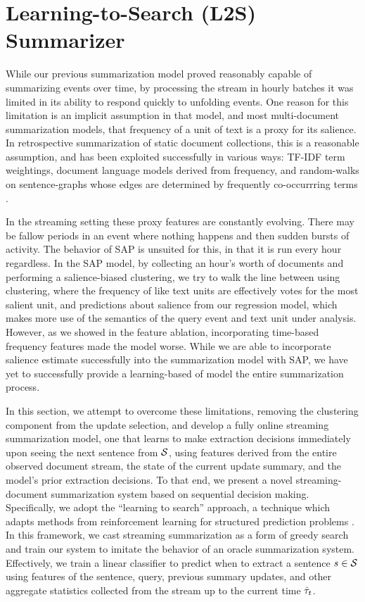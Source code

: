 \section{Learning-to-Search (L2S) Summarizer}

While our previous summarization model proved reasonably capable of summarizing
events over time, by processing the stream in hourly batches it was limited in
its ability to respond quickly to unfolding events. One reason for this
limitation is an implicit assumption in that model, and most multi-document
summarization models, that frequency of a unit of text is a proxy for its
salience. In retrospective summarization of static document collections, this
is a reasonable assumption, and has been exploited successfully in various
ways: TF-IDF term weightings, document language models derived from frequency,
and random-walks on sentence-graphs  whose edges are determined by frequently
co-occurrring terms
\citep{lin2000,radev2000,erkan2004,mihalcea2004,nenkova2005,daume2006}. 

In the streaming setting these proxy features are constantly evolving. There
may be fallow periods in an event where nothing happens and then sudden bursts
of activity. The behavior of SAP is unsuited for this, in that it is run every
hour regardless.  In the SAP model, by collecting an hour's worth of documents
and performing a salience-biased clustering, we try to walk the line between
using clustering, where the frequency of like text units are effectively votes
for the most salient unit, and predictions about salience from our regression
model, which makes more use of the semantics of the query event and text unit
under analysis.  However, as we showed in the feature ablation, incorporating
time-based frequency features made the model worse. While we are able to
incorporate salience estimate successfully into the summarization model with
SAP, we have yet to successfully provide a learning-based of model the entire
summarization process.

In this section, we attempt to overcome these limitations, removing the
clustering component from the update selection, and develop a fully online
streaming summarization model, one that learns to make extraction decisions
immediately upon seeing the next sentence from $\mathcal{S}$, using features
derived from the entire observed document stream, the state of the current
update summary, and the model's prior extraction decisions.  To that end, we
present a novel streaming-document summarization system based on sequential
decision making.  Specifically, we adopt the ``learning to search'' approach, a
technique which adapts methods from reinforcement learning for structured
prediction problems \citep{daume2009,ross2010}.  In this framework, we cast
streaming summarization as a form of greedy search and train our system to
imitate the behavior of an oracle summarization system.  Effectively, we train
a linear classifier to predict when to extract a sentence $s \in
\mathcal{S}$ using features of the sentence, query, previous summary updates,
and other aggregate statistics collected from the stream up to the current time
$\hat{\tau}_t$. 

